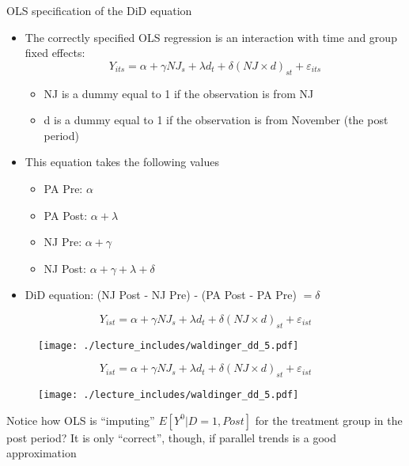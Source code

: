 \documentclass{beamer}
\begin{document}
\begin{frame}{OLS specification of the DiD equation}
	
	\begin{itemize}
	\item The correctly specified OLS regression is an interaction with time and group fixed effects:$$Y_{its} = \alpha + \gamma NJ_s + \lambda d_t + \delta (NJ \times d)_{st} + \varepsilon_{its}$$
		\begin{itemize}
		\item NJ is a dummy equal to 1 if the observation is from NJ
		\item d is a dummy equal to 1 if the observation is from November (the post period)
		\end{itemize}
	\item This equation takes the following values
		\begin{itemize}
		\item PA Pre: $\alpha$
		\item PA Post: $\alpha + \lambda$
		\item NJ Pre: $\alpha + \gamma$
		\item NJ Post: $\alpha + \gamma + \lambda + \delta$
		\end{itemize}
	\item DiD equation: (NJ Post - NJ Pre) - (PA Post - PA Pre) $= \delta$
	\end{itemize}
\end{frame}




\begin{frame}[plain]
	$$Y_{ist} = \alpha + \gamma NJ_s + \lambda d_t + \delta(NJ\times d)_{st} + \varepsilon_{ist}$$
	\begin{figure}
	\texttt{[image: ./lecture\_includes/waldinger\_dd\_5.pdf]}
	\end{figure}
\end{frame}


\begin{frame}[plain]
	$$Y_{ist} = \alpha + \gamma NJ_s + \lambda d_t + \delta(NJ\times d)_{st} + \varepsilon_{ist}$$
	\begin{figure}
	\texttt{[image: ./lecture\_includes/waldinger\_dd\_5.pdf]}
	\end{figure}

Notice how OLS is ``imputing'' $E[Y^0|D=1,Post]$ for the treatment group in the post period? It is only ``correct'', though, if parallel trends is a good approximation

\end{frame}
\end{document}
